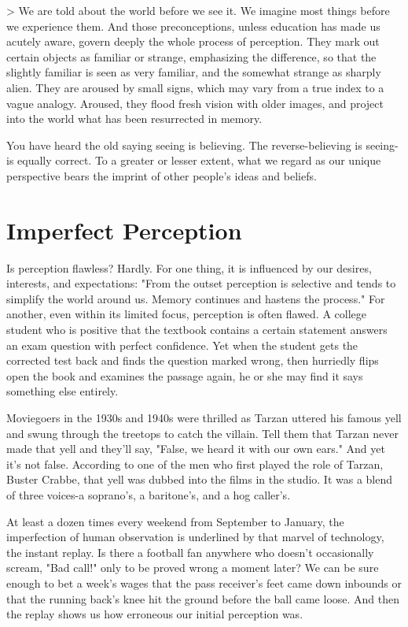 \documentclass{book}
\begin{document}
> We are told about the world before we see it. We imagine most things before we experience them. And those preconceptions, unless education has made us acutely aware, govern deeply the whole process of perception.  They mark out certain objects as familiar or strange, emphasizing the difference, so that the slightly familiar is seen as very familiar, and the somewhat strange as sharply alien. They are aroused by small signs, which may vary from a true index to a vague analogy. Aroused, they flood fresh vision with older images, and project into the world what has been resurrected in memory.

You have heard the old saying seeing is believing. The reverse-believing is seeing-is equally correct. To a greater or lesser extent, what we regard as our unique perspective bears the imprint of other people’s ideas and beliefs.

\section{Imperfect Perception}

Is perception flawless? Hardly. For one thing, it is influenced by our desires, interests, and expectations: "From the outset perception is selective and tends to simplify the world around us. Memory continues and hastens the process." For another, even within its limited focus, perception is often flawed. A college student who is positive that the textbook contains a certain statement answers an exam question with perfect confidence. Yet when the student gets the corrected test back and finds the question marked wrong, then hurriedly flips open the book and examines the passage again, he or she may find it says something else entirely.

Moviegoers in the 1930s and 1940s were thrilled as Tarzan uttered his famous yell and swung through the treetops to catch the villain. Tell them that Tarzan never made that yell and they’ll say, "False, we heard it with our own ears." And yet it’s not false. According to one of the men who first played the role of Tarzan, Buster Crabbe, that yell was dubbed into the films in the studio. It was a blend of three voices-a soprano’s, a baritone’s, and a hog caller’s.

At least a dozen times every weekend from September to January, the imperfection of human observation is underlined by that marvel of technology, the instant replay. Is there a football fan anywhere who doesn’t occasionally scream, "Bad call!" only to be proved wrong a moment later? We can be sure enough to bet a week’s wages that the pass receiver’s feet came down inbounds or that the running back’s knee hit the ground before the ball came loose. And then the replay shows us how erroneous our initial perception was.
\end{document}
